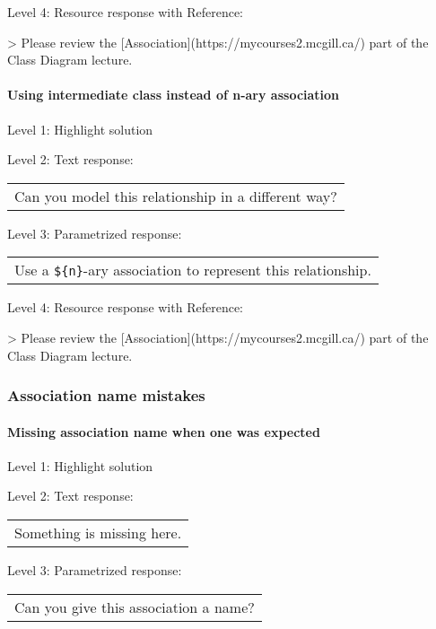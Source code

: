 \noindent Level 4: Resource response with Reference:

> Please review the [Association](https://mycourses2.mcgill.ca/) part of the Class Diagram lecture.


\paragraph{Using intermediate class instead of n-ary association}

\noindent Level 1: Highlight solution \medskip

\noindent Level 2: Text response: \medskip

\begin{tabular}{|c}
Can you model this relationship in a different way?
\end{tabular} \medskip

\noindent Level 3: Parametrized response: \medskip

\begin{tabular}{|c}
Use a \verb|${n}|-ary association to represent this relationship.
\end{tabular} \medskip

\noindent Level 4: Resource response with Reference:

> Please review the [Association](https://mycourses2.mcgill.ca/) part of the Class Diagram lecture.


\subsubsection{Association name mistakes}

\paragraph{Missing association name when one was expected}

\noindent Level 1: Highlight solution \medskip

\noindent Level 2: Text response: \medskip

\begin{tabular}{|c}
Something is missing here.
\end{tabular} \medskip

\noindent Level 3: Parametrized response: \medskip

\begin{tabular}{|c}
Can you give this association a name?
\end{tabular} \medskip

